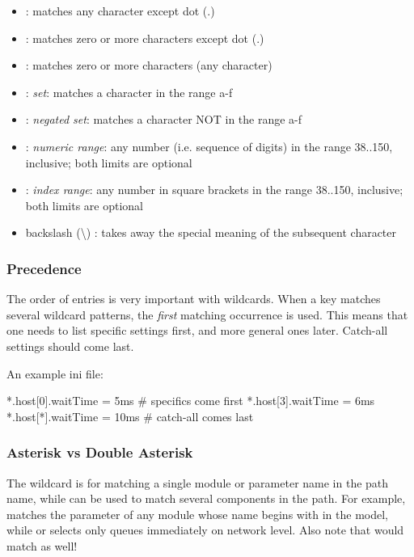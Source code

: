 \begin{itemize}
  \item {} : matches any character except dot (.)
  \item \ttt{*} : matches zero or more characters except dot (.)
  \item \ttt{**} : matches zero or more characters (any character)
  \item {} : \textit{set}: matches a character in the range a-f
  \item {}: \textit{negated set}: matches a character
    NOT in the range a-f
  \item {} : \textit{numeric range}: any number (i.e. sequence of digits)
    in the range 38..150, inclusive; both limits are optional
  \item \ttt{[38..150]} : \textit{index range}: any number in square brackets in the
    range 38..150, inclusive; both limits are optional
  \item backslash ({\textbackslash}) : takes away the special meaning of the
    subsequent character
\end{itemize}

\subsubsection{Precedence}
\label{sec:config-sim:precedence-of-entries}

The order of entries is very important with wildcards. When a key matches
several wildcard patterns, the \textit{first} matching occurrence
is used. This means that one needs to list specific settings first, and
more general ones later. Catch-all settings should come last.

An example ini file:

\begin{inifile}
[General]
*.host[0].waitTime = 5ms   # specifics come first
*.host[3].waitTime = 6ms
*.host[*].waitTime = 10ms  # catch-all comes last
\end{inifile}


\subsubsection{Asterisk vs Double Asterisk}
\label{sec:config-sim:asterisk-vs-double-asterisk}

The \ttt{*} wildcard is for matching a single module or parameter name in the
path name, while \ttt{**} can be used to match several components in the path.
For example,  matches the  parameter of any module
whose name begins with  in the model, while 
or  selects only queues immediately on network level.
Also note that  would match 
as well!

